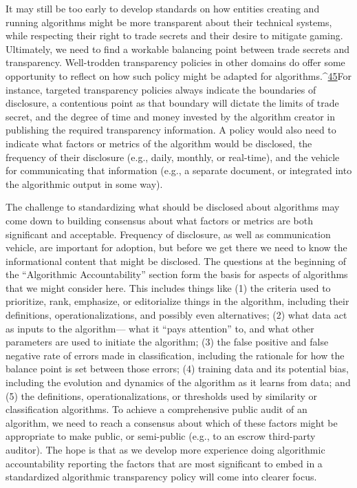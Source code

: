 It may still be too early to develop standards on how entities creating and running algorithms might be more transparent about their technical systems, while respecting their right to trade secrets and their desire to mitigate gaming. Ultimately, we need to find a workable balancing point between trade secrets and transparency. Well-trodden transparency policies in other domains do offer some opportunity to reflect on how such policy might be adapted for algorithms.^{\href{#endnotes}{45}}For instance, targeted transparency policies always indicate the boundaries of disclosure, a contentious point as that boundary will dictate the limits of trade secret, and the degree of time and money invested by the algorithm creator in publishing the required transparency information. A policy would also need to indicate what factors or metrics of the algorithm would be disclosed, the frequency of their disclosure (e.g., daily, monthly, or real-time), and the vehicle for communicating that information (e.g., a separate document, or integrated into the algorithmic output in some way). 

The challenge to standardizing what should be disclosed about algorithms may come down to building consensus about what factors or metrics are both significant and acceptable. Frequency of disclosure, as well as communication vehicle, are important for adoption, but before we get there we need to know the informational content that might be disclosed. The questions at the beginning of the ``Algorithmic Accountability'' section form the basis for aspects of algorithms that we might consider here. This includes things like (1) the criteria used to prioritize, rank, emphasize, or editorialize things in the algorithm, including their definitions, operationalizations, and possibly even alternatives; (2) what data act as inputs to the algorithm— what it ``pays attention'' to, and what other parameters are used to initiate the algorithm; (3) the false positive and false negative rate of errors made in classification, including the rationale for how the balance point is set between those errors; (4) training data and its potential bias, including the evolution and dynamics of the algorithm as it learns from data; and (5) the definitions, operationalizations, or thresholds used by similarity or classification algorithms. To achieve a comprehensive public audit of an algorithm, we need to reach a consensus about which of these factors might be appropriate to make public, or semi-public (e.g., to an escrow third-party auditor). The hope is that as we develop more experience doing algorithmic accountability reporting the factors that are most significant to embed in a standardized algorithmic transparency policy will come into clearer focus. 

